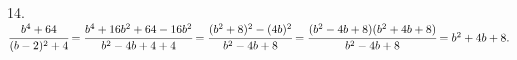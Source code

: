 14. $\cfrac{b^4+64}{(b-2)^2+4}=\cfrac{b^4+16b^2+64-16b^2}{b^2-4b+4+4}=\cfrac{(b^2+8)^2-(4b)^2}{b^2-4b+8}=\cfrac{(b^2-4b+8)(b^2+4b+8)}{b^2-4b+8}=b^2+4b+8.$\\
